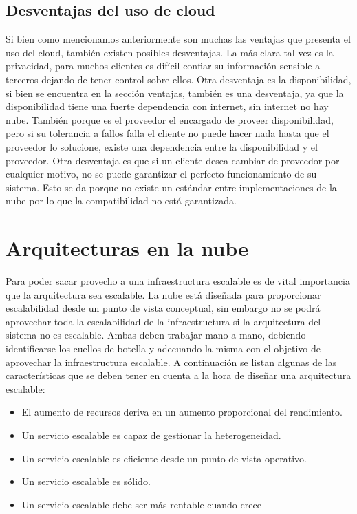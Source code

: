 \subsection {Desventajas del uso de cloud}
Si bien como mencionamos anteriormente son muchas las ventajas que presenta el uso del cloud, también existen posibles desventajas.
La más clara tal vez es la privacidad, para muchos clientes es difícil confiar su información sensible a terceros dejando de tener control sobre ellos.
Otra desventaja es la disponibilidad, si bien se encuentra en la sección ventajas, también es una desventaja, ya que la disponibilidad tiene una fuerte dependencia con internet, sin internet no hay nube. También porque es el proveedor el encargado de proveer disponibilidad, pero si su tolerancia a fallos falla el cliente no puede hacer nada hasta que el proveedor lo solucione, existe una dependencia entre la disponibilidad y el proveedor.
Otra desventaja es que si un cliente desea cambiar de proveedor por cualquier motivo, no se puede garantizar el perfecto funcionamiento de su sistema. Esto se da porque no existe un estándar entre implementaciones de la nube por lo que la compatibilidad no está garantizada.

\section{Arquitecturas en la nube}
Para poder sacar provecho a una infraestructura escalable es de vital importancia que la arquitectura sea escalable. La nube está diseñada para proporcionar escalabilidad desde un punto de vista conceptual, sin embargo no se podrá aprovechar toda la escalabilidad de la infraestructura si la arquitectura del sistema no es escalable. Ambas deben trabajar mano a mano, debiendo identificarse los cuellos de botella y adecuando la misma con el objetivo de aprovechar la infraestructura escalable. A continuación se listan algunas de las características que se deben tener en cuenta a la hora de diseñar una arquitectura escalable:

\begin{itemize}
\item El aumento de recursos deriva en un aumento proporcional del rendimiento.
\item Un servicio escalable es capaz de gestionar la heterogeneidad.
\item Un servicio escalable es eficiente desde un punto de vista operativo.
\item Un servicio escalable es sólido.
\item Un servicio escalable debe ser más rentable cuando crece
\end {itemize}


